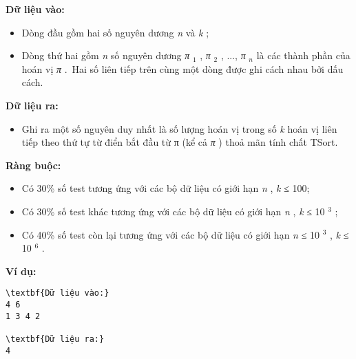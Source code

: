 \textbf{Dữ liệu vào: }
\begin{itemize}
	\item Dòng đầu gồm hai số nguyên dương \emph{ n } và \emph{ k } ;
	\item Dòng thứ hai gồm \emph{ n } số nguyên dương \emph{ π }$_ 1 $ , \emph{ π }$_ 2 $ , ..., \emph{ π }\emph{$_ n $}\emph{} là các thành phần của hoán vị \emph{ π } . Hai số liên tiếp trên cùng một dòng được ghi cách nhau bởi dấu cách.
\end{itemize}

\textbf{Dữ liệu ra: }
\begin{itemize}
	\item Ghi ra một số nguyên duy nhất là số lượng hoán vị trong số \emph{ k } hoán vị liên tiếp theo thứ tự từ điển bắt đầu từ π \emph{} (kể cả \emph{ π } ) thoả mãn tính chất TSort.
\end{itemize}

\textbf{Ràng buộc: }
\begin{itemize}
	\item Có 30\% số test tương ứng với các bộ dữ liệu có giới hạn \emph{ n } , \emph{ k } ≤ 100;
	\item Có 30\% số test khác tương ứng với các bộ dữ liệu có giới hạn \emph{ n } , \emph{ k } ≤ 10 $^ 3 $ ;
	\item Có 40\% số test còn lại tương ứng với các bộ dữ liệu có giới hạn \emph{ n } ≤ 10 $^ 3 $ , \emph{ k } ≤ 10 $^ 6 $ .
\end{itemize}

\textbf{Ví dụ: }
\begin{verbatim}
\textbf{Dữ liệu vào:}
4 6
1 3 4 2

\textbf{Dữ liệu ra:}
4\end{verbatim}